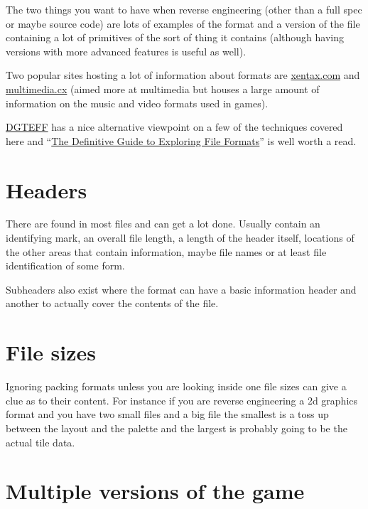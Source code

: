 \documentclass[
]{book}
\begin{document}
The two things you want to have when reverse engineering (other than a full spec or maybe source code) are lots of examples of the format and a version of the file containing a lot of primitives of the sort of thing it contains (although having versions with more advanced features is useful as well).

Two popular sites hosting a lot of information about formats are \href{http://wiki.xentax.com/index.php/Game_File_Format_Central}{xentax.com} and \href{http://wiki.multimedia.cx/index.php?title=Main_Page}{multimedia.cx} (aimed more at multimedia but houses a large amount of information on the music and video formats used in games).

\href{http://wiki.xentax.com/index.php?title=DGTEFF}{DGTEFF} has a nice alternative viewpoint on a few of the techniques covered here and ``\href{http://www.romhacking.net/docs/464/}{The Definitive Guide to Exploring File Formats}'' is well worth a read.

\hypertarget{headers}{%
\section{Headers}\label{headers}}

There are found in most files and can get a lot done. Usually contain an identifying mark, an overall file length, a length of the header itself, locations of the other areas that contain information, maybe file names or at least file identification of some form.

Subheaders also exist where the format can have a basic information header and another to actually cover the contents of the file.

\hypertarget{file-sizes}{%
\section{File sizes}\label{file-sizes}}

Ignoring packing formats unless you are looking inside one file sizes can give a clue as to their content. For instance if you are reverse engineering a 2d graphics format and you have two small files and a big file the smallest is a toss up between the layout and the palette and the largest is probably going to be the actual tile data.

\hypertarget{multiple-versions-of-the-game}{%
\section{Multiple versions of the game}\label{multiple-versions-of-the-game}}
\end{document}
